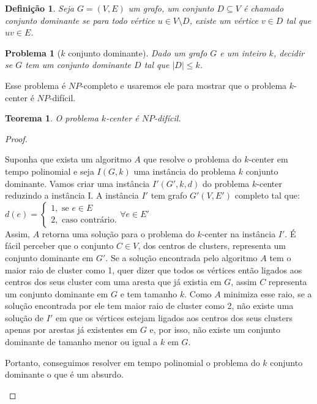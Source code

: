 \documentclass[12pt]{article}
\newtheorem{theorem}{Teorema}[section]
\newtheorem{definition}{Definição}[section]
\newtheorem{problem}{Problema}[section] %
\newcommand{\NP}{\mathit{NP}}
\newcommand{\red}[1]{{\color{red}{#1}}}
\begin{document}
\begin{definition}
    Seja $G = (V,E)$ um grafo, um conjunto $D \subseteq V$ é chamado conjunto dominante se para todo vértice $u \in V \setminus D$, existe um vértice $v \in D$ tal que $uv \in E$.
\end{definition}

\begin{problem}[$k$ conjunto dominante]
    Dado um grafo $G$ e um inteiro $k$, decidir se $G$ tem um conjunto dominante $D$ tal que $|D| \leq k$.      
\end{problem}
Esse problema é $\NP$-completo e usaremos ele para mostrar que o problema $k$-center é $\NP$-difícil. \red{Precisa mostrar que ele é $\NP$-completo?}

\begin{theorem}
    O problema $k$-center é $\NP$-difícil.
\end{theorem}

\begin{proof}
    \begin{it}
    Suponha que exista um algoritmo $A$ que resolve o problema do $k$-center em tempo polinomial e seja $I(G,k)$ uma instância do problema $k$ conjunto dominante. Vamos criar uma instância $I'(G',k,d)$ do problema $k$-center reduzindo a instância I. A instância $I'$ tem grafo $G'(V,E')$ completo tal que: \\
    $d(e) = \begin{cases}
            1, \text{ se } e \in E \\
            2, \text{ caso contrário.} 
            \end{cases}
            \forall e \in E'$\\

    Assim, $A$ retorna uma solução para o problema do $k$-center na instância $I'$. É fácil perceber que o conjunto $C \in V $, dos centros de clusters, representa um conjunto dominante em $G'$. Se a solução encontrada pelo algoritmo $A$ tem o maior raio de cluster como 1, quer dizer que todos os vértices então ligados aos centros dos seus cluster com uma aresta que já existia em $G$, assim $C$ representa um conjunto dominante em $G$ e tem tamanho $k$. Como $A$ minimiza esse raio, se a solução encontrada por ele tem maior raio de cluster como 2, não existe uma solução de $I'$ em que os vértices estejam ligados aos centros dos seus clusters apenas por arestas já existentes em $G$ e, por isso, não existe um conjunto dominante de tamanho menor ou igual a $k$ em $G$.

    Portanto, conseguimos resolver em tempo polinomial o problema do $k$ conjunto dominante o que é um absurdo.
        \end{it}
\end{proof}
\end{document}
